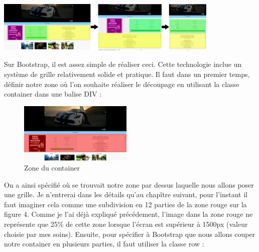 \documentclass{article}
\begin{document}
\begin{center}
  \includegraphics[width=0.8\textwidth]{p8}
\end{center}

Sur Bootstrap, il est assez simple de r\'ealiser ceci. Cette technologie inclue un syst\`eme de grille relativement solide et pratique. Il faut dans un premier temps, d\'efinir notre zone o\`u l'on souhaite r\'ealiser le d\'ecoupage en utilisant la classe \og container \fg{} dans une balise DIV :
\vspace{0.5cm}\\
\vspace{0.5cm}
\begin{figure}
  \vspace{-20pt}
  \begin{center}
    \includegraphics[width=0.48\textwidth]{p9}
  \end{center}
  \vspace{-20pt}
  \caption{Zone du container}
  \vspace{-10pt}
\end{figure} 
\hspace*{0.6cm}On a ainsi sp\'ecifi\'e o\`u se trouvait notre zone par dessus laquelle nous allons poser une grille. Je n'entrerai dans les d\'etails qu'au chap\^itre suivant, pour l'instant il faut imaginer cela comme une subdivision en 12 parties de la zone rouge sur la figure 4. Comme je l'ai d\'ej\`a expliqu\'e pr\'ec\'edement, l'image dans la zone rouge ne repr\'esente que 25\% de cette zone lorsque l'\'ecran est sup\'erieur \`a 1500px (valeur choisie par mes soins). Ensuite, pour sp\'ecifier \`a Bootstrap que nous allons couper notre container en plusieurs parties, il faut utiliser la classe \og row \fg{} : 
\vspace{0.5cm}\\
\end{document}
